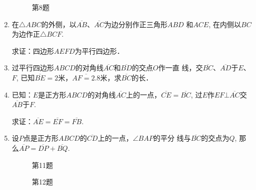 \begin{enumerate}
\begin{figure}[htp]
\begin{minipage}[t]{0.48\textwidth}
\begin{tikzpicture}[>=latex, scale=1]
    \end{tikzpicture}
    \caption*{第8题}
    \end{minipage}
    \end{figure}

\item 在$\triangle ABC$的外侧，以$\overline{AB}$、$\overline{AC}$为边分别作正三角形$ABD$
和$ACE$, 在内侧以$BC$为边作正$\triangle BCF$.

求证：四边形$AEFD$为平行四边形．
\item 过平行四边形$ABCD$的对角线$\overline{AC}$和$\overline{BD}$的交点$O$作一直
线，交$\overline{BC}$、$\overline{AD}$于$E$、$F$, 已知$\overline{BE}=2$米，$\overline{AF=2.8}$米，求$\overline{BC}$的长．
\item 已知：$E$是正方形$ABCD$的对角线$\overline{AC}$上的一点，$\overline{CE}=\overline{BC}$, 过$E$作$EF\bot \overline{AC}$交$\overline{AB}$于$F$.

求证：$\overline{AE}=\overline{EF}=\overline{FB}$.

\item 设$P$点是正方形$ABCD$的$\overline{CD}$上的一点，$\angle BAP$的平分
线与$\overline{BC}$的交点为$Q$, 那么$\overline{AP}=\overline{DP}+\overline{BQ}$.

\begin{figure}[htp]\centering
    \begin{minipage}[t]{0.48\textwidth}
    \centering
{}
    \caption*{第11题}
    \end{minipage}
    \begin{minipage}[t]{0.48\textwidth}
    \centering
    \caption*{第12题}
    \end{minipage}
    \end{figure}


\end{enumerate}

